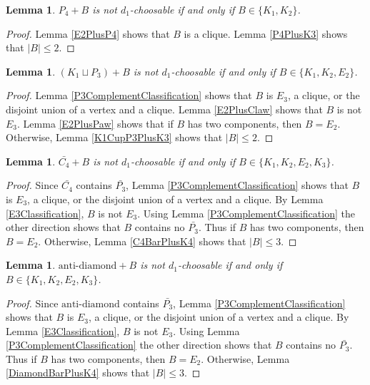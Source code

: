\documentclass[12pt]{article}
\theoremstyle{plain}
\newtheorem{lem}[thm]{Lemma}
\theoremstyle{definition}
\theoremstyle{remark}
\begin{document}
\begin{lem}\label{P4Classification}
$P_4 + B$ is not $d_1$-choosable if and only if $B \in \{K_1, K_2\}$.
\end{lem}
\begin{proof}
Lemma \ref{E2PlusP4} shows that $B$ is a clique.  Lemma \ref{P4PlusK3} shows that $|B| \leq 2$.
\end{proof}

\begin{lem}\label{K1CupP3Classification}
$(K_1 \sqcup P_3) + B$ is not $d_1$-choosable if and only if $B \in \{K_1, K_2, E_2\}$.
\end{lem}
\begin{proof}
Lemma \ref{P3ComplementClassification} shows that $B$ is $E_3$, a clique, or the disjoint union of a vertex and a clique.  Lemma \ref{E2PlusClaw} shows that $B$ is not $E_3$.  Lemma \ref{E2PlusPaw} shows that if $B$ has two components, then $B = E_2$.  Otherwise, Lemma \ref{K1CupP3PlusK3} shows that $|B| \leq 2$.
\end{proof}

\begin{lem}\label{C4ComplementClassification}
$\bar{C_4} + B$ is not $d_1$-choosable if and only if $B \in \{K_1, K_2, E_2, K_3\}$.
\end{lem}
\begin{proof}
Since $\bar{C_4}$ contains $\bar{P_3}$, Lemma \ref{P3ComplementClassification} shows that $B$ is $E_3$, a clique, or the disjoint union of a vertex and a clique.  By Lemma \ref{E3Classification}, $B$ is not $E_3$.  Using Lemma \ref{P3ComplementClassification} the other direction shows that $B$ contains no $\bar{P_3}$.  Thus if $B$ has two components, then $B = E_2$.  Otherwise, Lemma \ref{C4BarPlusK4} shows that $|B| \leq 3$.
\end{proof}

\begin{lem}\label{DiamondComplementClassification}
$\text{anti-diamond} + B$ is not $d_1$-choosable if and only if $B \in \{K_1, K_2, E_2, K_3\}$.
\end{lem}
\begin{proof}
Since $\text{anti-diamond}$ contains $\bar{P_3}$, Lemma \ref{P3ComplementClassification} shows that $B$ is $E_3$, a clique, or the disjoint union of a vertex and a clique.  By Lemma \ref{E3Classification}, $B$ is not $E_3$. Using Lemma \ref{P3ComplementClassification} the other direction shows that $B$ contains no $\bar{P_3}$.  Thus if $B$ has two components, then $B = E_2$.  Otherwise, Lemma \ref{DiamondBarPlusK4} shows that $|B| \leq 3$. 
\end{proof}
\end{document}
